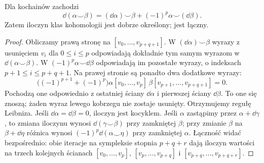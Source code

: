 \begin{stwierdzenie}
\label{prop:kubek-leibniz-16}
Dla kochainów zachodzi
\[
 \dd(\alpha\smile\beta)
 =(\dd\alpha)\smile\beta
       +(-1)^p\alpha\smile(\dd\beta).
\]
Zatem iloczyn klas kohomologii jest
dobrze określony; jest łączny.
\end{stwierdzenie}
\begin{proof}
Obliczamy prawą stronę na $[v_0,\ldots,v_{p+q+1}]$.
W $(\dd\alpha)\smile\beta$ wyrazy z usunięciem
$v_i$ dla $0\leq i\leq p$ odpowiadają dokładnie
tym samym wyrazom w $\dd(\alpha\smile\beta)$.
W $(-1)^p\alpha\smile\dd\beta$ odpowiadają im
pozostałe wyrazy, o indeksach $p+1\leq i\leq p+q+1$.
Na prawej stronie są ponadto dwa dodatkowe wyrazy:
\[
 \bigl((-1)^{p+1}+(-1)^p\bigr)
 \alpha[v_0,\ldots,v_p]\,
 \beta[v_{p+1},\ldots,v_{p+q+1}]=0.
\]
Pochodzą one odpowiednio z ostatniej ściany
$\dd\alpha$ i pierwszej ściany $\dd\beta$.
To one się znoszą; żaden wyraz lewego kobrzegu
nie zostaje usunięty. Otrzymujemy regułę Leibniza.
Jeśli $\dd\alpha=\dd\beta=0$,
iloczyn jest kocyklem.
Jeśli $\alpha$ zastąpimy przez
$\alpha+\dd\gamma$, to zmiana
iloczynu wynosi
$\dd(\gamma\smile\beta)$
przy zamkniętej $\beta$;
przy zmianie $\beta$ na $\beta+\dd\eta$ różnica
wynosi $(-1)^p\dd(\alpha\smile\eta)$ przy zamkniętej $\alpha$.
Łączność widać bezpośrednio:
obie iteracje na sympleksie
stopnia $p+q+r$ dają iloczyn
wartości na trzech kolejnych
ścianach
$[v_0,\ldots,v_p]$,
$[v_p,\ldots,v_{p+q}]$ i
$[v_{p+q},\ldots,v_{p+q+r}]$.
\end{proof}

